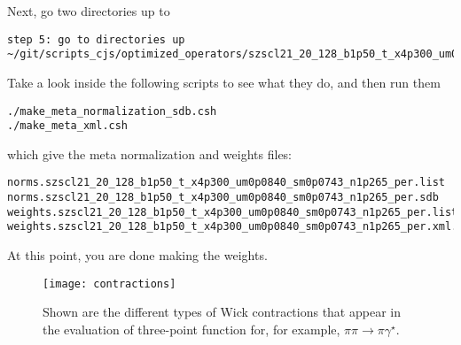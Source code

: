 \documentclass[prd,showpacs,showkeys,preprintnumbers,floatfix,
nofootinbib,superscriptaddress]{revtex4}
\begin{document}
Next, go two directories up to
\footnotesize
\begin{verbatim}
step 5: go to directories up
~/git/scripts_cjs/optimized_operators/szscl21_20_128_b1p50_t_x4p300_um0p0840_sm0p0743_n1p265_per
\end{verbatim} 
\normalsize

Take a look inside the following scripts to see what they do, and then run them
 \footnotesize
\begin{verbatim}
./make_meta_normalization_sdb.csh
./make_meta_xml.csh
 \end{verbatim} 
\normalsize
 which give the meta normalization and weights files:
\footnotesize
\begin{verbatim}
norms.szscl21_20_128_b1p50_t_x4p300_um0p0840_sm0p0743_n1p265_per.list
norms.szscl21_20_128_b1p50_t_x4p300_um0p0840_sm0p0743_n1p265_per.sdb
weights.szscl21_20_128_b1p50_t_x4p300_um0p0840_sm0p0743_n1p265_per.list
weights.szscl21_20_128_b1p50_t_x4p300_um0p0840_sm0p0743_n1p265_per.xml.
\end{verbatim} 
\normalsize
At this point, you are done making the weights. 

%
%

 


\begin{figure}[!h]
\begin{center}
\texttt{[image: contractions]}
\caption{Shown are the different types of Wick contractions that appear in the evaluation of three-point function for, for example, $\pi\pi\to\pi\gamma^\star$. }
\label{fig:contractions}
\end{center}
\end{figure}
\end{document}
